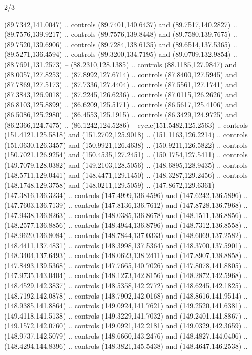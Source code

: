 \begin{flagdescription}{2/3}
\begin{scope}[shift={(0.5\flaglength,0.5)},scale=\flagwidth/320]
\begin{scope}[y=0.8pt, x=0.8pt, yscale=-1,shift={(-118.3,-146)}]
  (89.7342,141.0047) .. controls (89.7401,140.6437) and (89.7517,140.2827) ..
  (89.7576,139.9217) .. controls (89.7576,139.8448) and (89.7580,139.7675) ..
  (89.7520,139.6906) .. controls (89.7284,138.6135) and (89.6514,137.5365) ..
  (89.5271,136.4594) .. controls (89.3200,134.7195) and (89.0709,132.9854) ..
  (88.7691,131.2573) -- (88.2310,128.1385) .. controls (88.1185,127.9847) and
  (88.0057,127.8253) .. (87.8992,127.6714) .. controls (87.8400,127.5945) and
  (87.7869,127.5173) .. (87.7336,127.4404) .. controls (87.5561,127.1741) and
  (87.3843,126.9018) .. (87.2245,126.6236) .. controls (87.0115,126.2626) and
  (86.8103,125.8899) .. (86.6209,125.5171) .. controls (86.5617,125.4106) and
  (86.5086,125.2980) .. (86.4553,125.1915) .. controls (86.3429,124.9725) and
  (86.2366,124.7475) .. (86.1242,124.5286) -- cycle(151.5482,125.2563) ..
  controls (151.4121,125.5818) and (151.2702,125.9018) .. (151.1163,126.2214) ..
  controls (151.0630,126.3457) and (150.9921,126.4638) .. (150.9211,126.5822) ..
  controls (150.7021,126.9254) and (150.4535,127.2451) .. (150.1754,127.5411) ..
  controls (149.7079,128.0382) and (149.2103,128.5056) .. (148.6895,128.9435) ..
  controls (148.5711,129.0441) and (148.4471,129.1450) .. (148.3287,129.2456) ..
  controls (148.1748,129.3758) and (148.0211,129.5059) .. (147.8672,129.6361) --
  (147.3816,136.3234) .. controls (147.4999,136.4596) and (147.6242,136.5896) ..
  (147.7603,136.7139) .. controls (147.8136,136.7612) and (147.8728,136.7968) ..
  (147.9438,136.8263) .. controls (148.0385,136.8678) and (148.1511,136.8856) ..
  (148.2577,136.8856) .. controls (148.4944,136.8796) and (148.7312,136.8558) ..
  (148.9620,136.8084) .. controls (148.7844,137.0333) and (148.6069,137.2582) ..
  (148.4411,137.4831) .. controls (148.3998,137.5364) and (148.3700,137.5901) ..
  (148.3404,137.6493) .. controls (148.0623,138.2411) and (147.8907,138.8858) ..
  (147.8493,139.5368) .. controls (147.7665,140.7026) and (147.8078,141.8805) ..
  (147.9735,143.0404) .. controls (148.1273,142.8156) and (148.2872,142.5968) ..
  (148.4529,142.3837) .. controls (148.5358,142.2772) and (148.6245,142.1825) ..
  (148.7192,142.0878) .. controls (148.7902,142.0168) and (148.8616,141.9514) ..
  (148.9385,141.8864) .. controls (149.0924,141.7621) and (149.2520,141.6381) ..
  (149.4118,141.5138) .. controls (149.3229,141.7032) and (149.2401,141.8867) ..
  (149.1572,142.0760) .. controls (149.0921,142.2181) and (149.0329,142.3659) ..
  (148.9737,142.5079) .. controls (148.6660,143.2476) and (148.4827,144.0406) ..
  (148.4294,144.8396) .. controls (148.3821,145.5438) and (148.4647,146.2538) ..

\end{scope}
\end{scope}
\end{flagdescription}
